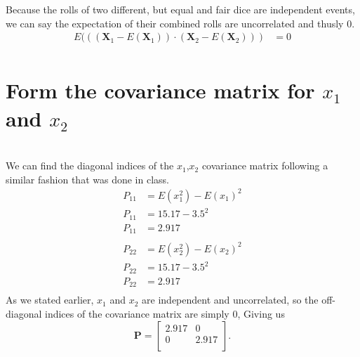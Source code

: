\documentclass[12pt,letterpaper, onecolumn]{exam}
\begin{document}
\begin{questions}
\begin{parts}
{\begin{subparts}
						            \solution
						            Because the rolls of two different, but equal and fair dice are independent events, we can say the expectation of their combined rolls are uncorrelated and thusly 0.
						            \begin{equation}
						                \begin{split}
						                    E(((\mathbf{X}_1 - E(\mathbf{X}_1))\cdot(\mathbf{X}_2 - E(\mathbf{X}_2))) & = 0\\
						                \end{split}
						            \end{equation}

						        \end{subparts}}
        \part{Form the covariance matrix for $x_1$ and $x_2$}\\
		        \solution
		        We can find the diagonal indices of the $x_1$,$x_2$ covariance matrix following a similar fashion that was done in class.
		        \begin{equation}\begin{split}\label{eq:9}
		                P_{11} & = E(x_1^2) - E(x_1)^2\\
		                P_{11} & = 15.17 - 3.5^2\\
		                P_{11} & = 2.917\\
		            \end{split}\end{equation}
		        \begin{equation}\begin{split}
		                P_{22} & = E(x_2^2) - E(x_2)^2\\
		                P_{22} & = 15.17 - 3.5^2\\
		                P_{22} & = 2.917\\
		            \end{split}\end{equation}
		        As we stated earlier, $x_1$ and $x_2$ are independent and uncorrelated, so the off-diagonal indices of the covariance matrix are simply 0, Giving us
		        \[\mathbf{P} =
		            \begin{bmatrix}
		                2.917 & 0     \\
		                0     & 2.917 \\
		            \end{bmatrix}.\]


\end{parts}
\end{questions}
\end{document}
